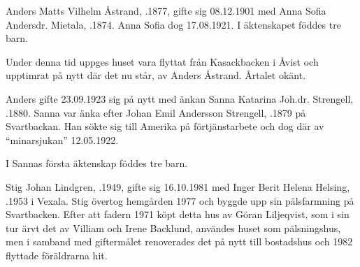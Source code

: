 Anders Matts Vilhelm Åstrand, .1877, gifte sig 08.12.1901 med Anna Sofia Andersdr. Mietala, .1874. Anna Sofia dog 17.08.1921. I äktenskapet föddes tre barn.
\begin{jhchildren}
  \item {}
  \item {}}
  \item \jhperson{\jhbold{\jhname[Jenny Sofia]{Åstrand, Jenny Sofia}}}{29.07.1912}{}
\end{jhchildren}

Under denna tid uppges huset vara flyttat från Kasackbacken i Åvist och upptimrat på nytt där det nu står, av Anders Åstrand. Årtalet okänt.

Anders gifte 23.09.1923 sig på nytt med änkan Sanna Katarina Joh.dr. Strengell, .1880. Sanna var änka efter Johan Emil Andersson Strengell, .1879 på Svartbackan. Han sökte sig till Amerika på förtjänstarbete och dog där av ``minarsjukan'' 12.05.1922.

I Sannas första äktenskap föddes tre barn.
\begin{jhchildren}
  \item {}
  \item {}
  \item {}
\end{jhchildren}






Stig Johan Lindgren, .1949, gifte sig 16.10.1981 med Inger Berit Helena Helsing, .1953 i Vexala. Stig övertog hemgården 1977 och byggde upp sin pälsfarmning på Svartbacken. Efter att fadern 1971 köpt detta hus av Göran Liljeqvist, som i sin tur ärvt det av Villiam och Irene Backlund, användes huset som pälsningshus, men i samband med giftermålet renoverades det på nytt till bostadshus och 1982 flyttade föräldrarna hit.

